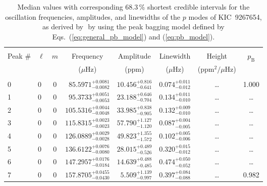 \begin{table*}[!]
\caption{Median values with corresponding 68.3\,\% shortest credible intervals for the oscillation frequencies, amplitudes, and linewidths of the $p$ modes of KIC~9267654, as derived by \diamonds\,\,by using the peak bagging model defined by Eqs.~(\ref{eq:general_pb_model}) and (\ref{eq:pb_model}).}
\label{tab:9267654p}
\centering
\begin{tabular}{llcrrlrc}
\hline\hline
\\[-8pt]
Peak \# & $\ell$ & $m$ & \multicolumn{1}{c}{Frequency} & \multicolumn{1}{c}{Amplitude} & \multicolumn{1}{c}{Linewidth} & \multicolumn{1}{c}{Height}& $p_\mathrm{B}$\\
 & & & \multicolumn{1}{c}{($\mu$Hz)} & \multicolumn{1}{c}{(ppm)} & \multicolumn{1}{c}{($\mu$Hz)} & \multicolumn{1}{c}{(ppm$^2/\mu$Hz)}\\
\hline \\[-8pt]
0 & 0 & 0 & $     85.5971_{-      0.0082}^{+      0.0081}$ & $      10.456_{-       0.641}^{+       0.816}$ & $       0.074_{-       0.012}^{+       0.011}$ & \multicolumn{1}{c}{\dots} & 1.000\\[1pt]
1 & 0 & 0 & $     95.3733_{-      0.0053}^{+      0.0051}$ & $      23.188_{-       0.704}^{+       0.646}$ & $       0.134_{-       0.010}^{+       0.011}$ & \multicolumn{1}{c}{\dots} & \dots \\[1pt]
2 & 0 & 0 & $    105.5316_{-      0.0048}^{+      0.0044}$ & $      33.985_{-       0.905}^{+       0.838}$ & $       0.132_{-       0.010}^{+       0.009}$ & \multicolumn{1}{c}{\dots} & \dots \\[1pt]
3 & 0 & 0 & $    115.8315_{-      0.0023}^{+      0.0023}$ & $      57.790_{-       1.120}^{+       1.127}$ & $       0.087_{-       0.005}^{+       0.004}$ & \multicolumn{1}{c}{\dots} & \dots \\[1pt]
4 & 0 & 0 & $    126.0889_{-      0.0028}^{+      0.0029}$ & $      49.823_{-       1.572}^{+       1.355}$ & $       0.102_{-       0.006}^{+       0.005}$ & \multicolumn{1}{c}{\dots} & \dots \\[1pt]
5 & 0 & 0 & $    136.6122_{-      0.0080}^{+      0.0076}$ & $      28.015_{-       0.526}^{+       0.489}$ & $       0.320_{-       0.012}^{+       0.015}$ & \multicolumn{1}{c}{\dots} & \dots \\[1pt]
6 & 0 & 0 & $    147.2957_{-      0.0184}^{+      0.0176}$ & $      14.639_{-       0.485}^{+       0.488}$ & $       0.474_{-       0.052}^{+       0.050}$ & \multicolumn{1}{c}{\dots} & \dots \\[1pt]
7 & 0 & 0 & $    157.8705_{-      0.0430}^{+      0.0455}$ & $       5.509_{-       0.997}^{+       1.139}$ & $       0.397_{-       0.088}^{+       0.084}$ & \multicolumn{1}{c}{\dots} & 0.982\\[1pt]


\end{tabular}
\end{table*}
